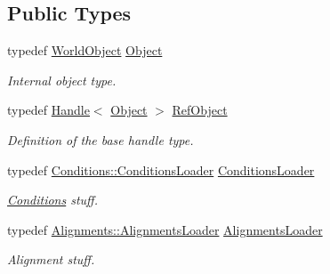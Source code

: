 \subsection*{Public Types}
\begin{DoxyCompactItemize}
\item 
typedef \hyperlink{class_d_d4hep_1_1_geometry_1_1_world_object}{WorldObject} \hyperlink{class_d_d4hep_1_1_geometry_1_1_world_ade4542483ec578548cb266880f67e329}{Object}
\begin{DoxyCompactList}\small\item\em Internal object type. \item\end{DoxyCompactList}\item 
typedef \hyperlink{class_d_d4hep_1_1_handle}{Handle}$<$ \hyperlink{class_d_d4hep_1_1_geometry_1_1_world_object}{Object} $>$ \hyperlink{class_d_d4hep_1_1_geometry_1_1_world_a796916c7109e45753547adc18d85aa7f}{RefObject}
\begin{DoxyCompactList}\small\item\em Definition of the base handle type. \item\end{DoxyCompactList}\item 
typedef \hyperlink{class_d_d4hep_1_1_conditions_1_1_conditions_loader}{Conditions::ConditionsLoader} \hyperlink{class_d_d4hep_1_1_geometry_1_1_world_aadddae79d9d6be44141befbbb4b7337b}{ConditionsLoader}
\begin{DoxyCompactList}\small\item\em \hyperlink{namespace_d_d4hep_1_1_conditions}{Conditions} stuff. \item\end{DoxyCompactList}\item 
typedef \hyperlink{class_d_d4hep_1_1_alignments_1_1_alignments_loader}{Alignments::AlignmentsLoader} \hyperlink{class_d_d4hep_1_1_geometry_1_1_world_a4756d57ac9e7f6d43056b07dfbfe6904}{AlignmentsLoader}
\begin{DoxyCompactList}\small\item\em Alignment stuff. \item\end{DoxyCompactList}\end{DoxyCompactItemize}
